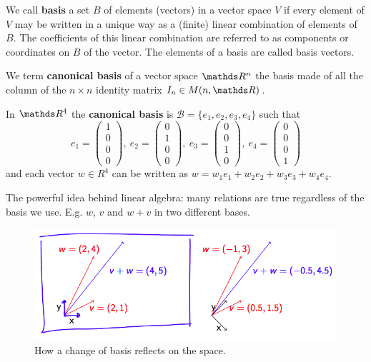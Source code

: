 \documentclass[computationalMathematics.tex]{subfiles}
\begin{document}
\begin{definition}[Basis]
  We call \textbf{basis} a set $B$ of elements (vectors) in a vector space $V$ if every element of $V$ may be written in a unique way as a (finite) linear combination of elements of $B$.
  The coefficients of this linear combination are referred to as components or coordinates on $B$ of the vector.
  The elements of a basis are called basis vectors.
\end{definition}

\begin{definition}
  We term \textbf{canonical basis} of a vector space $\R^n$ the basis made of all the column of the $n \times n$ identity matrix $I_n \in M(n, \R)$.
\end{definition}

\begin{example}
  In $\R^4$ the \textbf{canonical basis} is $ \mathcal{B} = \{ e_1, e_2, e_3, e_4\}$ such that
  \[
  e_1 = \begin{pmatrix} 1\\ 0\\ 0\\ 0 \end{pmatrix},~
  e_2 = \begin{pmatrix} 0\\ 1\\ 0\\ 0 \end{pmatrix},~
  e_3 = \begin{pmatrix} 0\\ 0\\ 1\\ 0 \end{pmatrix},~
  e_4 = \begin{pmatrix} 0\\ 0\\ 0\\ 1 \end{pmatrix}
\]
  and each vector $w \in R^4$ can be written as $w = w_1e_1 + w_2e_2 + w_3e_3 + w_4e_4$.
\end{example}
The powerful idea behind linear algebra: many relations are true
regardless of the basis we use. E.g. $w$, $v$ and $w + v$ in two different bases.
\begin{figure}[H]
    \centering
    \includegraphics[scale=0.45]{pics/20sett/3.png}
    \caption{How a change of basis reflects on the space.}\label{fig:20sett1}
\end{figure}
\end{document}
